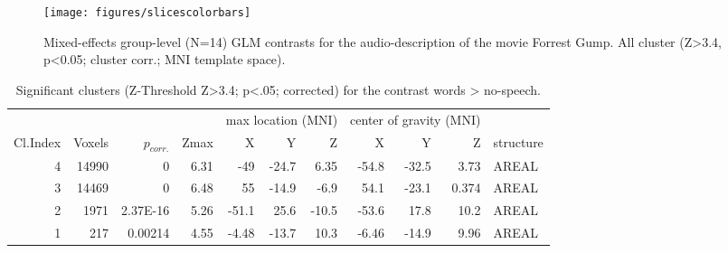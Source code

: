 \documentclass[10pt,a4paper,onecolumn]{article}
\begin{document}
\begin{figure*}
  \centering
  \texttt{[image: figures/slicescolorbars]}
  \caption{Mixed-effects group-level (N=14) GLM contrasts for the audio-description of the movie Forrest Gump. All cluster (Z>3.4, p<0.05; cluster corr.; MNI template space).}
  \label{fig:results}
\end{figure*}

\begin{table*}[t]
    \caption{Significant clusters (Z-Threshold Z>3.4; p<.05; corrected) for the contrast words > no-speech.}
\label{tab:cope1}
\begin{tabular}{rrrrrrrrrrp{3cm}}
\toprule
& & & & \multicolumn{3}{r}{max location (MNI)} & \multicolumn{3}{r}{center of gravity (MNI)} &
\\ \cmidrule{5-7} \cmidrule{8-10}
Cl.\-Index & Voxels & $p_{corr.}$ & Z\-max & X & Y & Z  & X & Y & Z & structure \\
\midrule
4 & 14990 & 0 & 6.31 & -49 & -24.7 & 6.35 & -54.8 & -32.5 & 3.73 & AREAL \\
3 & 14469 & 0 & 6.48 & 55 & -14.9 & -6.9 & 54.1 & -23.1 & 0.374 & AREAL \\
2 & 1971 & 2.37E-16 & 5.26 & -51.1 & 25.6 & -10.5 & -53.6 & 17.8 & 10.2 & AREAL \\
1 & 217 & 0.00214 & 4.55 & -4.48 & -13.7 & 10.3 & -6.46 & -14.9 & 9.96 & AREAL \\
\bottomrule
\end{tabular}
\end{table*}
\end{document}
